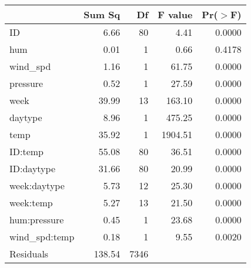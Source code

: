 \begin{table}[ht]
\centering
\begin{tabular}{lrrrr}
  \hline
 & Sum Sq & Df & F value & Pr($>$F) \\ 
  \hline
ID & 6.66 & 80 & 4.41 & 0.0000 \\ 
  hum & 0.01 & 1 & 0.66 & 0.4178 \\ 
  wind\_spd & 1.16 & 1 & 61.75 & 0.0000 \\ 
  pressure & 0.52 & 1 & 27.59 & 0.0000 \\ 
  week & 39.99 & 13 & 163.10 & 0.0000 \\ 
  daytype & 8.96 & 1 & 475.25 & 0.0000 \\ 
  temp & 35.92 & 1 & 1904.51 & 0.0000 \\ 
  ID:temp & 55.08 & 80 & 36.51 & 0.0000 \\ 
  ID:daytype & 31.66 & 80 & 20.99 & 0.0000 \\ 
  week:daytype & 5.73 & 12 & 25.30 & 0.0000 \\ 
  week:temp & 5.27 & 13 & 21.50 & 0.0000 \\ 
  hum:pressure & 0.45 & 1 & 23.68 & 0.0000 \\ 
  wind\_spd:temp & 0.18 & 1 & 9.55 & 0.0020 \\ 
  Residuals & 138.54 & 7346 &  &  \\ 
   \hline
\end{tabular}
\end{table}
